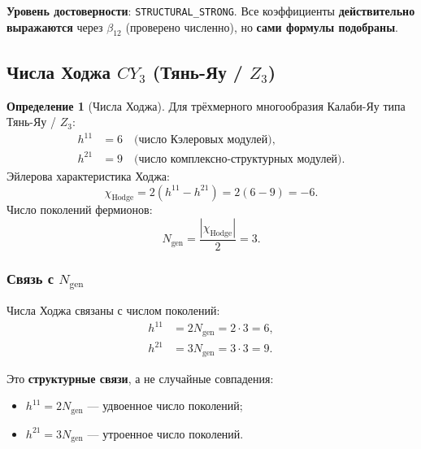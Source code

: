 \documentclass[11pt,a4paper]{article}
\newcommand{\CY}{\ensuremath{CY_3}}
\newcommand{\Ngen}{\ensuremath{N_{\text{gen}}}}
\theoremstyle{definition}
\newtheorem{definition}[theorem]{Определение}
\begin{document}
\medskip\noindent
\textbf{Уровень достоверности}: \texttt{STRUCTURAL\_STRONG}.
Все коэффициенты \textbf{действительно выражаются} через $\beta_{12}$
(проверено численно), но \textbf{сами формулы подобраны}.

\subsection{Числа Ходжа \texorpdfstring{$\CY$}{CY3} (Тянь-Яу / \texorpdfstring{$Z_3$}{Z3})}
\label{subsec:hodge}

\begin{definition}[Числа Ходжа]
\label{def:hodge}
Для трёхмерного многообразия Калаби-Яу типа Тянь-Яу / $Z_3$:
\begin{align}
    h^{11} &= 6 \quad \text{(число Кэлеровых модулей)}, \\
    h^{21} &= 9 \quad \text{(число комплексно-структурных модулей)}.
\end{align}
Эйлерова характеристика Ходжа:
\begin{equation}
    \chi_{\text{Hodge}} = 2(h^{11} - h^{21}) = 2(6 - 9) = -6.
\end{equation}
Число поколений фермионов:
\begin{equation}
    \Ngen = \frac{|\chi_{\text{Hodge}}|}{2} = 3.
\end{equation}
\end{definition}

\subsubsection{Связь с \texorpdfstring{$N_{\text{gen}}$}{N\_gen}}

Числа Ходжа связаны с числом поколений:
\begin{align}
    h^{11} &= 2 \Ngen = 2 \cdot 3 = 6, \\
    h^{21} &= 3 \Ngen = 3 \cdot 3 = 9.
\end{align}

Это \textbf{структурные связи}, а не случайные совпадения:
\begin{itemize}
    \item $h^{11} = 2 \Ngen$ --- удвоенное число поколений;
    \item $h^{21} = 3 \Ngen$ --- утроенное число поколений.
\end{itemize}
\end{document}
